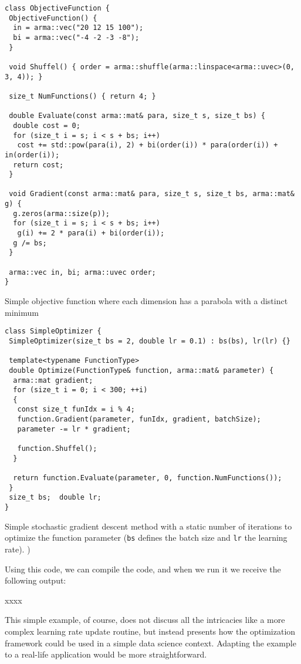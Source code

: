 \documentclass{article}
\begin{document}
\begin{listing}[H]
\begin{verbatim}
class ObjectiveFunction {
 ObjectiveFunction() {
  in = arma::vec("20 12 15 100");
  bi = arma::vec("-4 -2 -3 -8");
 }

 void Shuffel() { order = arma::shuffle(arma::linspace<arma::uvec>(0, 3, 4)); }

 size_t NumFunctions() { return 4; }

 double Evaluate(const arma::mat& para, size_t s, size_t bs) {
  double cost = 0;
  for (size_t i = s; i < s + bs; i++)
   cost += std::pow(para(i), 2) + bi(order(i)) * para(order(i)) + in(order(i));
  return cost;
 }

 void Gradient(const arma::mat& para, size_t s, size_t bs, arma::mat& g) {
  g.zeros(arma::size(p));
  for (size_t i = s; i < s + bs; i++)
   g(i) += 2 * para(i) + bi(order(i));
  g /= bs;
 }

 arma::vec in, bi; arma::uvec order;
}
\end{verbatim}
\caption{Simple objective function where each dimension has a parabola with a
  distinct minimum}
\end{listing}
\begin{listing}[H]
\begin{verbatim}
class SimpleOptimizer {
 SimpleOptimizer(size_t bs = 2, double lr = 0.1) : bs(bs), lr(lr) {}

 template<typename FunctionType>
 double Optimize(FunctionType& function, arma::mat& parameter) {
  arma::mat gradient;
  for (size_t i = 0; i < 300; ++i)
  {
   const size_t funIdx = i % 4;
   function.Gradient(parameter, funIdx, gradient, batchSize);
   parameter -= lr * gradient;

   function.Shuffel();
  }

  return function.Evaluate(parameter, 0, function.NumFunctions());
 }
 size_t bs;  double lr;
}
\end{verbatim}
\caption{Simple stochastic gradient descent method with a static number of
iterations to optimize the function parameter ({\tt bs} defines the batch size
and {\tt lr} the learning rate). )}
\end{listing}

Using this code, we can compile the code, and when we run it we receive the
following output:

xxxx

This simple example, of course, does not discuss all the intricacies like a more
complex learning rate update routine, but instead presents how the optimization
framework could be used in a simple data science context. Adapting the example
to a real-life application would be more straightforward.
\end{document}
